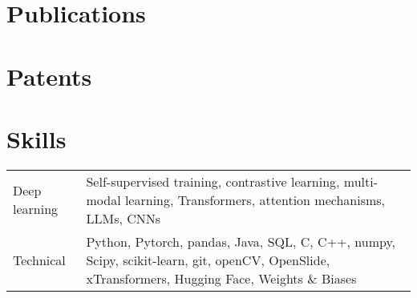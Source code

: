 \documentclass[a4paper,12pt]{article}
\begin{document}
\section{Publications}
\begin{refsection}
\nocite{*}
\printbibliography[heading=none]
\end{refsection}

\section{Patents}
\begin{refsection}
\nocite{*}
\printbibliography[heading=none]
\end{refsection}



\section{Skills}
\begin{tabularx}{\linewidth}{@{}l X@{}}
Deep learning & \normalsize{Self-supervised training, contrastive learning, multi-modal learning, Transformers, attention mechanisms, LLMs, CNNs}\\
Technical &  \normalsize{Python, Pytorch, pandas, Java, SQL, C, C++,  numpy, Scipy, scikit-learn, git, openCV, OpenSlide, xTransformers, Hugging Face, Weights \& Biases} 
\end{tabularx}

\vfill
{}
\end{document}
